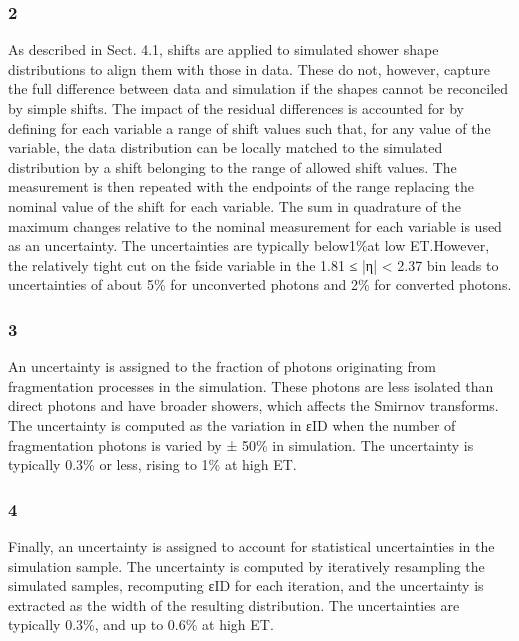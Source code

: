 \documentclass{ctexart}
\begin{document}
\subsubsection{2}
As described in Sect. 4.1, shifts are applied to simulated
shower shape distributions to align them with those in
data. These do not, however, capture the full difference
between data and simulation if the shapes cannot be reconciled
by simple shifts. The impact of the residual differences
is accounted for by defining for each variable a
range of shift values such that, for any value of the variable,
the data distribution can be locally matched to the simulated distribution by a shift belonging to the range of
allowed shift values. The measurement is then repeated
with the endpoints of the range replacing the nominal
value of the shift for each variable. The sum in quadrature
of the maximum changes relative to the nominal
measurement for each variable is used as an uncertainty.
The uncertainties are typically below1\%at low ET.However,
the relatively tight cut on the fside variable in the
1.81 ≤ |η| < 2.37 bin leads to uncertainties of about 5\%
for unconverted photons and 2\% for converted photons.
\subsubsection{3}
An uncertainty is assigned to the fraction of photons originating
from fragmentation processes in the simulation.
These photons are less isolated than direct photons and
have broader showers, which affects the Smirnov transforms.
The uncertainty is computed as the variation in εID
when the number of fragmentation photons is varied by
± 50\% in simulation. The uncertainty is typically 0.3\%
or less, rising to 1\% at high ET.
\subsubsection{4}
Finally, an uncertainty is assigned to account for statistical
uncertainties in the simulation sample. The uncertainty
is computed by iteratively resampling the simulated
samples, recomputing εID for each iteration, and the uncertainty is extracted as the width of the resulting
distribution. The uncertainties are typically 0.3\%, and up
to 0.6\% at high ET.
\end{document}
